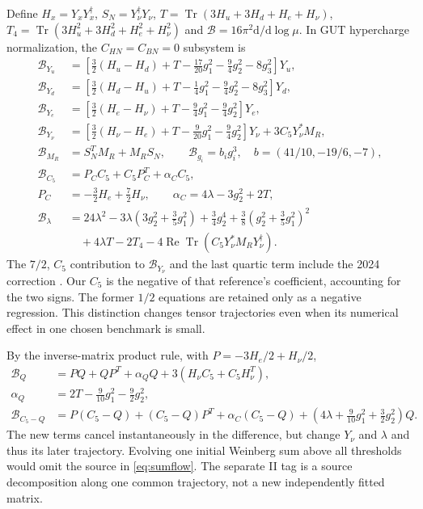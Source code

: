 \documentclass[11pt]{article}
\newcommand{\tr}{\operatorname{Tr}}
\newcommand{\dd}{\mathrm d}
\newcommand{\B}{\mathcal B}
\begin{document}
Define $H_x=Y_xY_x^\dagger$, $S_N=Y_\nu^\dagger Y_\nu$,
$T=\tr(3H_u+3H_d+H_e+H_\nu)$,
$T_4=\tr(3H_u^2+3H_d^2+H_e^2+H_\nu^2)$ and
$\B=16\pi^2\dd/\dd\log\mu$. In GUT hypercharge normalization,
the $C_{HN}=C_{BN}=0$ subsystem is
\begin{align}
 \B_{Y_u}&=[\tfrac32(H_u-H_d)+T-\tfrac{17}{20}g_1^2
 -\tfrac94g_2^2-8g_3^2]Y_u,\\
 \B_{Y_d}&=[\tfrac32(H_d-H_u)+T-\tfrac14g_1^2
 -\tfrac94g_2^2-8g_3^2]Y_d,\\
 \B_{Y_e}&=[\tfrac32(H_e-H_\nu)+T-\tfrac94g_1^2
 -\tfrac94g_2^2]Y_e,\\
 \B_{Y_\nu}&=[\tfrac32(H_\nu-H_e)+T-\tfrac9{20}g_1^2
 -\tfrac94g_2^2]Y_\nu+3C_5Y_\nu^*M_R,\\
 \B_{M_R}&=S_N^TM_R+M_RS_N,\qquad
 \B_{g_i}=b_ig_i^3,\quad b=(41/10,-19/6,-7),\\
 \B_{C_5}&=P_CC_5+C_5P_C^T+\alpha_CC_5,\\
 P_C&=-\tfrac32H_e+\tfrac72H_\nu,\qquad
 \alpha_C=4\lambda-3g_2^2+2T,\\
 \B_\lambda&=24\lambda^2-3\lambda(3g_2^2+\tfrac35g_1^2)
 +\tfrac34g_2^4+\tfrac38(g_2^2+\tfrac35g_1^2)^2\nonumber\\
 &\quad+4\lambda T-2T_4
 -4\operatorname{Re}\tr(C_5Y_\nu^*M_RY_\nu^\dagger).
\end{align}
The $7/2$, $C_5$ contribution to $\B_{Y_\nu}$ and the last quartic
term include the 2024 correction \cite{Zhang2024}. Our $C_5$ is the
negative of that reference's coefficient, accounting for the two signs.
The former $1/2$ equations are retained only as a negative regression.
This distinction changes tensor trajectories even when its numerical
effect in one chosen benchmark is small.

By the inverse-matrix product rule, with
$P=-3H_e/2+H_\nu/2$,
\begin{align}
 \B_Q&=PQ+QP^T+\alpha_QQ+3(H_\nu C_5+C_5H_\nu^T),\\
 \alpha_Q&=2T-\tfrac9{10}g_1^2-\tfrac92g_2^2,\\
 \B_{C_5-Q}&=P(C_5-Q)+(C_5-Q)P^T+\alpha_C(C_5-Q)
 +(4\lambda+\tfrac9{10}g_1^2+\tfrac32g_2^2)Q. \label{eq:sumflow}
\end{align}
The new terms cancel instantaneously in the difference, but change
$Y_\nu$ and $\lambda$ and thus its later trajectory. Evolving one
initial Weinberg sum above all thresholds would omit the source in
\eqref{eq:sumflow}. The separate II tag is a source decomposition
along one common trajectory, not a new independently fitted matrix.
\end{document}
